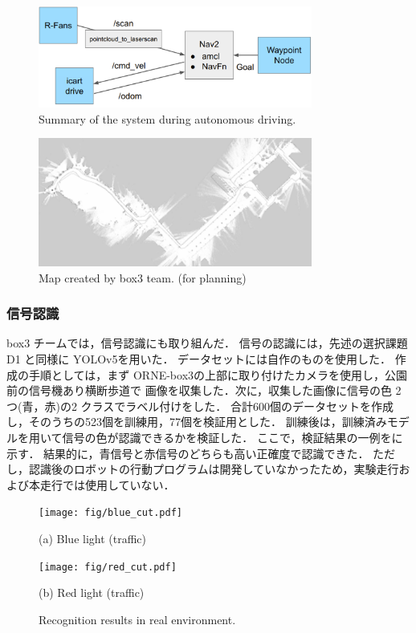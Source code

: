 \documentclass[twocolumn, 9pt]{jsproceedings}
\begin{document}
\begin{figure}[h!]
  \centering
  \includegraphics[width=90mm]{fig/box3_system.pdf}
  \caption{Summary of the system during autonomous driving.}
  \label{fig:box3-system}
\end{figure}

\begin{figure}[H]
  \centering
  \includegraphics[width=90mm]{fig/3-map.pdf}
  \caption{Map created by box3 team. (for planning)}
  \label{fig:3-map}
\end{figure}

\subsubsection{信号認識}
box3 チームでは，信号認識にも取り組んだ．
信号の認識には，先述の選択課題 D1 と同様に YOLOv5を用いた．
データセットには自作のものを使用した．
作成の手順としては，まず ORNE-box3の上部に取り付けたカメラを使用し，公園前の信号機あり横断歩道で
画像を収集した．次に，収集した画像に信号の色 2つ(青，赤)の2 クラスでラベル付けをした．
合計600個のデータセットを作成し，そのうちの523個を訓練用，77個を検証用とした．
訓練後は，訓練済みモデルを用いて信号の色が認識できるかを検証した．
ここで，検証結果の一例をに示す．
結果的に，青信号と赤信号のどちらも高い正確度で認識できた．
ただし，認識後のロボットの行動プログラムは開発していなかったため，実験走行および本走行では使用していない．


\begin{figure}[h!]
  \begin{minipage}[t]{0.47\linewidth}
    \centering
    \texttt{[image: fig/blue\_cut.pdf]}
    \caption*{(a) Blue light (traffic)}
  \end{minipage}
  \hspace*{2mm}
  \begin{minipage}[t]{0.47\linewidth}
    \centering
    \texttt{[image: fig/red\_cut.pdf]}
    \caption*{(b) Red light (traffic)}
  \end{minipage}
  \caption{Recognition results in real environment.}
  \label{fig:traffic}
\end{figure}
\end{document}
